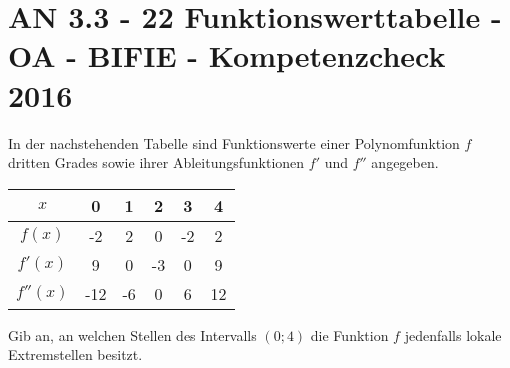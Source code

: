 \section{AN 3.3 - 22 Funktionswerttabelle - OA - BIFIE - Kompetenzcheck 2016}

\begin{beispiel}[AN 3.3]{1} %
				In der nachstehenden Tabelle sind Funktionswerte einer Polynomfunktion $f$ dritten Grades sowie ihrer Ableitungsfunktionen $f'$ und $f''$ angegeben.\\

\begin{center}
\begin{tabular}{|c|c|c|c|c|c|}\hline
$x$&0&1&2&3&4\\ \hline
$f(x)$&-2&2&0&-2&2\\ \hline
$f'(x)$&9&0&-3&0&9\\ \hline
$f''(x)$&-12&-6&0&6&12\\ \hline
\end{tabular}

\end{center}
Gib an, an welchen Stellen des Intervalls $\left(0;4\right)$ die Funktion $f$ jedenfalls lokale Extremstellen besitzt.\\


\end{beispiel}	